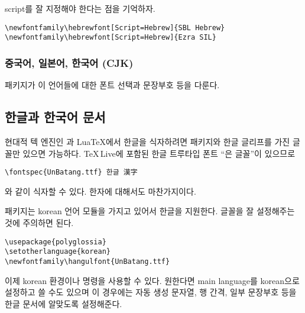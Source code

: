script를 잘 지정해야 한다는 점을 기억하자.

\begin{lscommand}
\verb|\newfontfamily\hebrewfont[Script=Hebrew]{SBL Hebrew}| \\
\verb|\newfontfamily\hebrewfont[Script=Hebrew]{Ezra SIL}|
\end{lscommand}


\subsubsection{중국어, 일본어, 한국어 (CJK)}

\cite{xecjk} 패키지가 이 언어들에 대한 폰트 선택과 문장부호 등을 다룬다.


\subsection{한글과 한국어 문서}
현대적 텍 엔진인 \XeTeX 과 Lua\TeX 에서 한글을 식자하려면  패키지와 한글 글리프를 가진 글꼴만 
있으면 가능하다. \TeX\,Live에 포함된 한글 트루타입 폰트 ``은 글꼴''이 있으므로 
\begin{verbatim}
\fontspec{UnBatang.ttf} 한글 漢字
\end{verbatim}
와 같이 식자할 수 있다. 한자에 대해서도 마찬가지이다.

 패키지는 korean 언어 모듈을 가지고 있어서 한글을 지원한다.
글꼴을 잘 설정해주는 것에 주의하면 된다.
\begin{verbatim}
\usepackage{polyglossia}
\setotherlanguage{korean}
\newfontfamily\hangulfont{UnBatang.ttf}
\end{verbatim}
이제 korean 환경이나  명령을 사용할 수 있다. 원한다면 main language를 korean으로 설정하고 쓸 수도
있으며 이 경우에는 자동 생성 문자열, 행 간격, 일부 문장부호 등을 한글 문서에 알맞도록 설정해준다.

